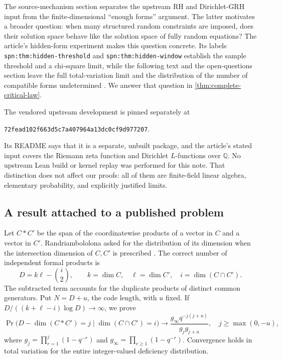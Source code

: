 \documentclass[11pt]{article}
\theoremstyle{definition}
\theoremstyle{remark}
\begin{document}
The source-mechanism section separates the upstream RH and Dirichlet-GRH
input from the finite-dimensional ``enough forms'' argument. The latter
motivates a broader question: when many structured random constraints
are imposed, does their solution space behave like the solution space
of fully random equations? The article's hidden-form experiment makes
this question concrete. Its labels
\texttt{spn:thm:hidden-threshold} and
\texttt{spn:thm:hidden-window} establish the sample threshold and a
chi-square limit, while the following text and the open-questions section
leave the full total-variation limit and the distribution of the number
of compatible forms undetermined \cite{ProveItSpanning}.
We answer that question in \cref{thm:complete-critical-law}.

The vendored upstream development is pinned separately at
\begin{center}\small\texttt{72fead102f663d5c7a407964a13dc0cf9d977207}.\end{center}
Its README says that
it is a separate, unbuilt package, and the article's stated input covers
the Riemann zeta function and Dirichlet $L$-functions over $\mathbb Q$.
No upstream Lean build or kernel replay was performed for this note.
That distinction does not affect our proofs: all of them are finite-field
linear algebra, elementary probability, and explicitly justified limits.

\subsection{A result attached to a published problem}
Let $C*C'$ be the span of the coordinatewise products of a vector in
$C$ and a vector in $C'$. Randriambololona asked for the distribution of
its dimension when the intersection dimension of $C,C'$ is prescribed
\cite[Problem~21]{Randriambololona2015}. The correct number of independent
formal products is
\[
 D=k\ell-\binom i2,
 \qquad k=\dim C,\quad\ell=\dim C',\quad i=\dim(C\cap C').
\]
The subtracted term accounts for the duplicate products of distinct
common generators. Put $N=D+u$, the code length, with $u$ fixed.
If $D/((k+\ell-i)\log D)\to\infty$, we prove
\begin{equation}\label{eq:intro-main}
 \Pr\bigl(D-\dim(C*C')=j\mid\dim(C\cap C')=i\bigr)
 \longrightarrow
 \frac{g_\infty q^{-j(j+u)}}{g_jg_{j+u}},
 \quad j\ge\max(0,-u),
\end{equation}
where $g_j=\prod_{r=1}^{j}(1-q^{-r})$ and
$g_\infty=\prod_{r\ge1}(1-q^{-r})$. Convergence holds in total variation
for the entire integer-valued deficiency distribution.
\end{document}
